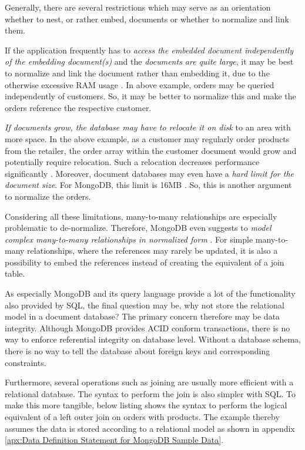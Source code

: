 Generally, there are several restrictions which may serve as an orientation whether to nest, or rather embed, documents or whether to normalize and link them. \par 
If the application frequently has to \emph{access the embedded document independently of the embedding document(s)} and the \emph{documents are quite large}, it may be best to normalize and link the document rather than embedding it, due to the otherwise excessive RAM usage \cite{MongoDBAppliedDesign}. In above example, orders may be queried independently of customers. So, it may be better to normalize this and make the orders reference the respective customer.\par 
\emph{If documents grow, the database may have to relocate it on disk} to an area with more space. In the above example, as a customer may regularly order products from the retailer, the order array within the customer document would grow and potentially require relocation. Such a relocation decreases performance significantly \cite{MongoDBAppliedDesign}. Moreover, document databases may even have a \emph{hard limit for the document size}. For MongoDB, this limit is 16MB \cite{MongoDBDocumentSizeLimit}. So, this is another argument to normalize the orders.\par 
Considering all these limitations, many-to-many relationships are especially problematic to de-normalize. Therefore, MongoDB even suggests to \emph{model complex many-to-many relationships in normalized form} \cite{MongoDBDataModeling}. For simple many-to-many relationships, where the references may rarely be updated, it is also a possibility to embed the references instead of creating the equivalent of a join table.\par
As especially MongoDB and its query language provide a lot of the functionality also provided by SQL, the final question may be, why not store the relational model in a document database? The primary concern therefore may be data integrity. Although MongoDB provides ACID conform transactions, there is no way to enforce referential integrity on database level. Without a database schema, there is no way to tell the database about foreign keys and corresponding constraints.\par Furthermore, several operations such as joining are usually more efficient with a relational database. The syntax to perform the join is also simpler with SQL. To make this more tangible, below listing shows the syntax to perform the logical equivalent of a left outer join on orders with products. The example thereby assumes the data is stored according to a relational model as shown in appendix \ref{apx:Data Definition Statement for MongoDB Sample Data}.\\

